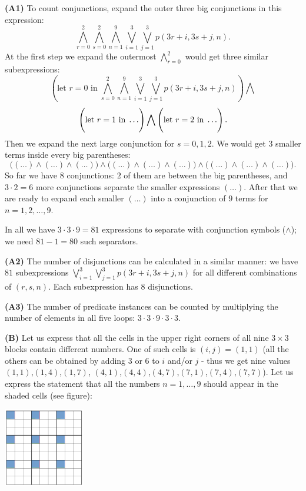 \documentclass[jou]{apa6}
\begin{document}
\vspace{6pt}
{\bf (A1)} To count conjunctions, expand
the outer three big conjunctions in this expression:
$$\bigwedge\limits_{r = 0}^{2} \bigwedge\limits_{s = 0}^{2} \bigwedge\limits_{n = 1}^{9}
\bigvee\limits_{i = 1}^{3} \bigvee\limits_{j = 1}^{3} p(3r+i, 3s+j, n).$$
At the first step we expand the outermost $\bigwedge\limits_{r=0}^2$ 
would get three similar subexpressions:
$$\left( \mbox{let $r=0$ in}\; 
\bigwedge\limits_{s = 0}^{2} \bigwedge\limits_{n = 1}^{9}
\bigvee\limits_{i = 1}^{3} \bigvee\limits_{j = 1}^{3} p(3r+i, 3s+j, n) \right) \bigwedge$$
$$\left( \vphantom{\bigwedge\limits_{s = 0}^{2}} \mbox{let $r=1$ in}\; \ldots \right) \bigwedge 
\left( \vphantom{\bigwedge\limits_{s = 0}^{2}} \mbox{let $r=2$ in}\; \ldots \right).$$
Then we expand the next large conjunction for $s=0,1,2$. We would get $3$ smaller terms
inside every big parentheses:
{\small
$$\Big( (\ldots) \wedge (\ldots) \wedge (\ldots) \Big) \wedge
\Big( (\ldots) \wedge (\ldots) \wedge (\ldots) \Big) \wedge
\Big( (\ldots) \wedge (\ldots) \wedge (\ldots) \Big).$$
}
So far we have $8$ conjunctions: $2$ of them are between the big parentheses, 
and $3 \cdot 2 = 6$ more conjunctions separate the smaller expressions $(\ldots)$. 
After that we are ready to expand each smaller $(\ldots)$ into a conjunction of $9$ terms
for $n=1,2,\ldots,9$. 

In all we have $3 \cdot 3 \cdot 9 = 81$ expressions to separate with conjunction 
symbols ($\wedge$); we need $81-1 = 80$ such separators. 

{\bf (A2)} The number of disjunctions can be calculated in a similar manner: we have $81$ subexpressions
$\bigvee\limits_{i = 1}^{3} \bigvee\limits_{j = 1}^{3} p(3r+i, 3s+j, n)$ for all different 
combinations of $(r,s,n)$. Each subexpression has $8$ disjunctions. 

{\bf (A3)} The number of predicate instances can be counted by multiplying the 
number of elements in all five loops: $3 \cdot 3 \cdot 9 \cdot 3 \cdot 3$. 

{\bf (B)} Let us express that all the cells in the upper right corners
of all nine $3 \times 3$ blocks contain different numbers. 
One of such cells is $(i,j) = (1,1)$ (all the others can be obtained by 
adding $3$ or $6$ to $i$ and/or $j$ - thus we get nine values
$(1,1)$,$(1,4)$,$(1,7)$,
$(4,1)$,$(4,4)$,$(4,7)$,$(7,1)$,$(7,4)$,$(7,7)$). Let us express the 
statement that all the numbers $n=1,\ldots,9$ 
should appear in the shaded cells (see figure):
\begin{center}
\includegraphics[width=1.4in]{sudoku2.png}
\end{center}
\end{document}
